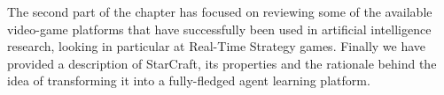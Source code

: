 The second part of the chapter has focused on reviewing some of the available
video-game platforms that have successfully been used in artificial intelligence
research, looking in particular at Real-Time Strategy games. Finally we have
provided a description of StarCraft, its properties and the rationale behind the
idea of transforming it into a fully-fledged agent learning platform.

